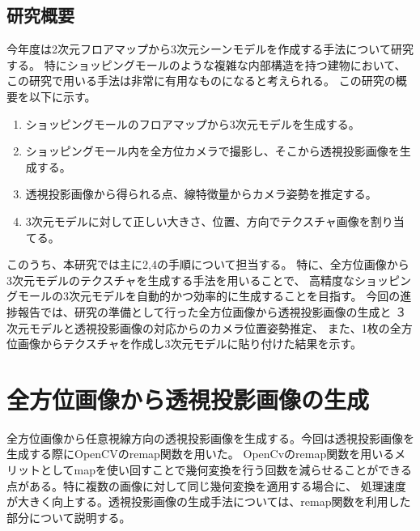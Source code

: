 \documentclass[]{jarticle}          %
\begin{document}
\subsection{研究概要}
今年度は2次元フロアマップから3次元シーンモデルを作成する手法について研究する。
特にショッピングモールのような複雑な内部構造を持つ建物において、この研究で用いる手法は非常に有用なものになると考えられる。
この研究の概要を以下に示す。
\begin{enumerate}
  \item ショッピングモールのフロアマップから3次元モデルを生成する。
  \item ショッピングモール内を全方位カメラで撮影し、そこから透視投影画像を生成する。
  \item 透視投影画像から得られる点、線特徴量からカメラ姿勢を推定する。
  \item 3次元モデルに対して正しい大きさ、位置、方向でテクスチャ画像を割り当てる。
\end{enumerate}
このうち、本研究では主に2,4の手順について担当する。
特に、全方位画像から3次元モデルのテクスチャを生成する手法を用いることで、
高精度なショッピングモールの3次元モデルを自動的かつ効率的に生成することを目指す。
今回の進捗報告では、研究の準備として行った全方位画像から透視投影画像の生成と
３次元モデルと透視投影画像の対応からのカメラ位置姿勢推定、
また、1枚の全方位画像からテクスチャを作成し3次元モデルに貼り付けた結果を示す。

\section{全方位画像から透視投影画像の生成}
全方位画像から任意視線方向の透視投影画像を生成する。今回は透視投影画像を生成する際にOpenCVのremap関数を用いた。
OpenCvのremap関数を用いるメリットとしてmapを使い回すことで幾何変換を行う回数を減らせることができる点がある。特に複数の画像に対して同じ幾何変換を適用する場合に、
処理速度が大きく向上する。透視投影画像の生成手法については、remap関数を利用した部分について説明する。
\end{document}
